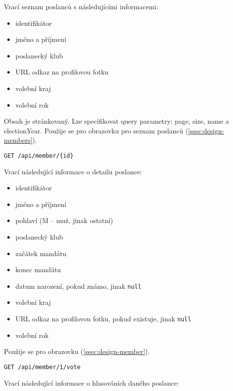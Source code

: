 \noindent Vrací seznam poslanců s následujícími informacemi:

\begin{itemize}
	\item identifikátor
	\item jméno a příjmení
	\item poslanecký klub
	\item URL odkaz na profilovou fotku
	\item volební kraj
	\item volební rok
\end{itemize}

\noindent Obsah je stránkovaný. Lze specifikovat query parametry: page, size, name a electionYear. Použije se pro obrazovku pro seznam poslanců (\ref{ssec:design-members}).

\vspace{10px}

\begin{lstlisting}[label={lst:endpoint-member}] 
GET /api/member/{id}
\end{lstlisting}

\noindent Vrací následující informace o detailu poslance:

\begin{itemize}
	\item identifikátor
	\item jméno a příjmení
	\item pohlaví (M -- muž, jinak ostatní)
	\item poslanecký klub
	\item začátek mandátu
	\item konec mandátu
	\item datum narození, pokud známo, jinak \lstinline|null|
	\item volební kraj
	\item URL odkaz na profilovou fotku, pokud existuje, jinak \lstinline|null|
	\item volební rok
\end{itemize}

\noindent Použije se pro obrazovku (\ref{ssec:design-member}).

\vspace{10px}

\begin{lstlisting}[label={lst:endpoint-member-votes}] 
GET /api/member/1/vote
\end{lstlisting}

\noindent Vrací následující informace o hlasováních daného poslance:

